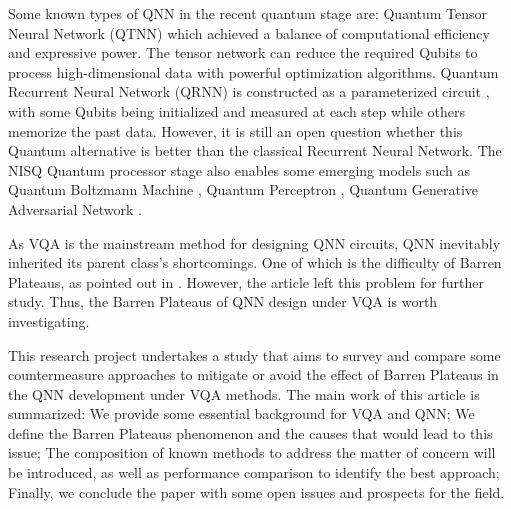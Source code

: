 Some known types of QNN in the recent quantum stage are: 
Quantum Tensor Neural Network (QTNN) \cite{hugginsQuantumMachineLearning2019} which achieved a balance of computational efficiency and expressive power. 
The tensor network can reduce the required Qubits to process high-dimensional data with powerful optimization algorithms.
Quantum Recurrent Neural Network (QRNN) is constructed as a parameterized circuit \cite{takakiLearningTemporalData2021}, with some Qubits being initialized and measured at each step while others memorize the past data.
However, it is still an open question whether this Quantum alternative is better than the classical Recurrent Neural Network.
The NISQ Quantum processor stage also enables some emerging models such as 
Quantum Boltzmann Machine \cite{shinguBoltzmannMachineLearning2021}\cite{zoufalVariationalQuantumBoltzmann2021}, 
Quantum Perceptron \cite{kristensenArtificialSpikingQuantum2021}, 
Quantum Generative Adversarial Network \cite{dallaire-demersQuantumGenerativeAdversarial2018}\cite{lloydQuantumGenerativeAdversarial2018}.

As VQA is the mainstream method for designing QNN circuits, QNN inevitably inherited its parent class's shortcomings.
One of which is the difficulty of Barren Plateaus, as pointed out in \cite{abbasPowerQuantumNeural2021}. However, the article left this problem for further study. Thus, the Barren Plateaus of QNN design under VQA is worth investigating.

This research project undertakes a study that aims to survey and compare some countermeasure approaches to mitigate or avoid the effect of Barren Plateaus in the QNN development under VQA methods. 
The main work of this article is summarized: 
We provide some essential background for VQA and QNN;
We define the Barren Plateaus phenomenon and the causes that would lead to this issue; 
The composition of known methods to address the matter of concern will be introduced, as well as performance comparison to identify the best approach; 
Finally, we conclude the paper with some open issues and prospects for the field.



